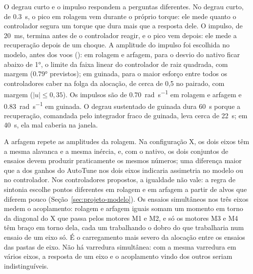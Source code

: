 O degrau curto e o impulso respondem a perguntas diferentes. No degrau curto,
de \SI{0.3}{\second}, o pico em rolagem vem durante o próprio torque: ele mede
quanto o controlador segura um torque que dura mais que a resposta dele. O
impulso, de \SI{20}{\milli\second}, termina antes de o controlador reagir, e
o pico vem depois: ele mede a recuperação depois de um choque. A amplitude do
impulso foi escolhida no modelo, antes dos voos
(): em rolagem e arfagem, para o desvio do
nativo ficar abaixo de \ang{1}, o limite da faixa linear do controlador de
raiz quadrada, com margem (\ang{0.79} previstos); em guinada, para o maior
esforço entre todos os controladores caber na folga da alocação, de cerca de
0,5 no pairado, com margem ($|u| \le 0{,}35$). Os impulsos são de
\SI{0.70}{\radian\per\second} em rolagem e arfagem e
\SI{0.83}{\radian\per\second} em guinada. O degrau sustentado de guinada dura \SI{60}{\second} porque a
recuperação, comandada pelo integrador fraco de guinada, leva cerca de
\SI{22}{\second}; em \SI{40}{\second}, ela mal caberia na janela.

A arfagem repete as amplitudes da rolagem. Na configuração X, os dois eixos
têm a mesma alavanca e a mesma inércia, e, com o nativo, os dois conjuntos de
ensaios devem produzir praticamente os mesmos números; uma diferença maior
que a dos ganhos do AutoTune nos dois eixos indicaria assimetria no modelo ou
no controlador. Nos controladores propostos, a igualdade não vale: a regra de
sintonia escolhe pontos diferentes em rolagem e em arfagem a partir de alvos
que diferem pouco (Seção~\ref{sec:projeto-modelo}). Os ensaios simultâneos nos três eixos medem o
acoplamento: rolagem e arfagem iguais somam um momento em torno da diagonal
do X que passa pelos motores M1 e M2, e só os motores M3 e M4 têm braço em
torno dela, cada um trabalhando o dobro do que trabalharia num ensaio de um
eixo só. É o carregamento mais severo da alocação entre os ensaios das pastas
de eixo. Não há varredura simultânea: com a mesma varredura em vários eixos,
a resposta de um eixo e o acoplamento vindo dos outros seriam
indistinguíveis.

